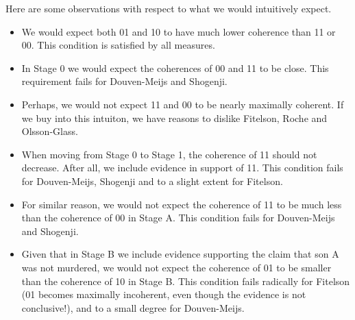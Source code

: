 \documentclass[10pt,]{scrartcl}
\begin{document}
\begin{table}[H]
\caption{Coherence scores and  probabilities for the Sally Clark BN after evidence of bruising in both sons and of   disease in son A.}
\label{tab:SCcoherenceStageB}
\end{table}


Here  are some observations with respect to what we would intuitively expect.



\begin{itemize}
    \item We would expect both 01 and 10 to have much lower coherence than 11 or 00. This condition is satisfied by all measures.
    \item  In Stage 0 we would expect the coherences of 00 and 11 to be close. This requirement fails for Douven-Meijs and Shogenji.
    \item Perhaps, we would not expect 11 and 00 to be nearly maximally coherent. If we buy into this intuiton, we have reasons to dislike Fitelson, Roche and Olsson-Glass.
    \item When moving from Stage 0 to Stage 1, the coherence of 11 should not decrease. After all, we include evidence in support of 11. This condition fails for Douven-Meijs, Shogenji and to a slight extent for Fitelson.
    \item For similar reason, we would not expect the coherence of 11 to be much less than the coherence of 00 in Stage A. This condition fails for Douven-Meijs and Shogenji.
    \item Given that in Stage B we include evidence supporting the claim that son A was not murdered, we would not expect the coherence of 01 to be smaller than the coherence of 10 in Stage B. This condition fails radically for Fitelson (01 becomes maximally incoherent, even though the evidence is not conclusive!), and to a small degree for Douven-Meijs.
\end{itemize}
\end{document}
